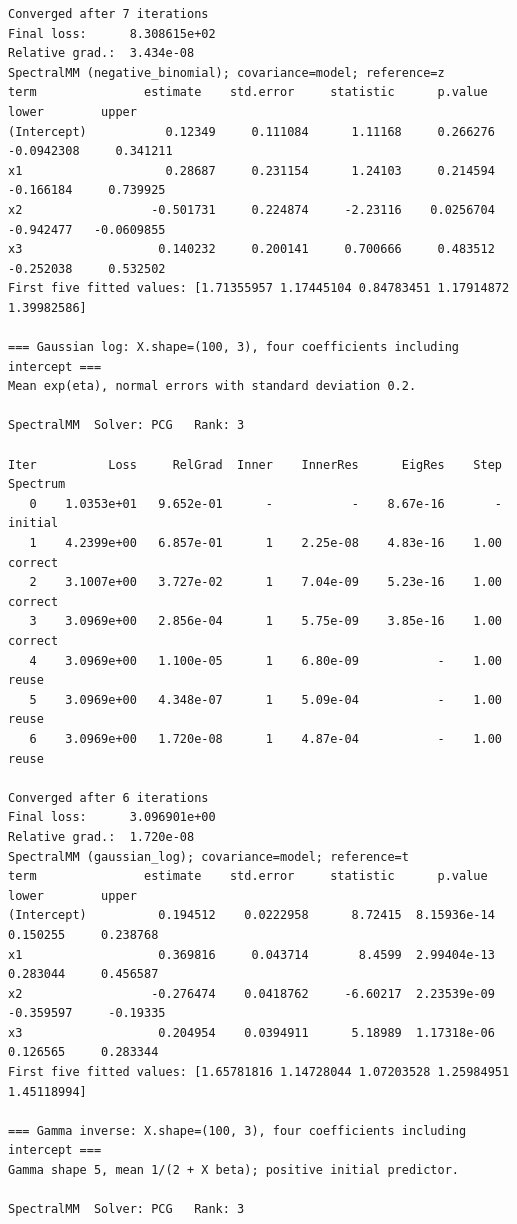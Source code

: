 \documentclass[11pt]{article}
\begin{document}
\begin{lstlisting}
Converged after 7 iterations
Final loss:      8.308615e+02
Relative grad.:  3.434e-08
SpectralMM (negative_binomial); covariance=model; reference=z
term               estimate    std.error     statistic      p.value        lower        upper
(Intercept)           0.12349     0.111084      1.11168     0.266276   -0.0942308     0.341211
x1                    0.28687     0.231154      1.24103     0.214594    -0.166184     0.739925
x2                  -0.501731     0.224874     -2.23116    0.0256704    -0.942477   -0.0609855
x3                   0.140232     0.200141     0.700666     0.483512    -0.252038     0.532502
First five fitted values: [1.71355957 1.17445104 0.84783451 1.17914872 1.39982586]

=== Gaussian log: X.shape=(100, 3), four coefficients including intercept ===
Mean exp(eta), normal errors with standard deviation 0.2.

SpectralMM  Solver: PCG   Rank: 3

Iter          Loss     RelGrad  Inner    InnerRes      EigRes    Step  Spectrum
   0    1.0353e+01   9.652e-01      -           -    8.67e-16       -  initial
   1    4.2399e+00   6.857e-01      1    2.25e-08    4.83e-16    1.00  correct
   2    3.1007e+00   3.727e-02      1    7.04e-09    5.23e-16    1.00  correct
   3    3.0969e+00   2.856e-04      1    5.75e-09    3.85e-16    1.00  correct
   4    3.0969e+00   1.100e-05      1    6.80e-09           -    1.00  reuse
   5    3.0969e+00   4.348e-07      1    5.09e-04           -    1.00  reuse
   6    3.0969e+00   1.720e-08      1    4.87e-04           -    1.00  reuse

Converged after 6 iterations
Final loss:      3.096901e+00
Relative grad.:  1.720e-08
SpectralMM (gaussian_log); covariance=model; reference=t
term               estimate    std.error     statistic      p.value        lower        upper
(Intercept)          0.194512    0.0222958      8.72415  8.15936e-14     0.150255     0.238768
x1                   0.369816     0.043714       8.4599  2.99404e-13     0.283044     0.456587
x2                  -0.276474    0.0418762     -6.60217  2.23539e-09    -0.359597     -0.19335
x3                   0.204954    0.0394911      5.18989  1.17318e-06     0.126565     0.283344
First five fitted values: [1.65781816 1.14728044 1.07203528 1.25984951 1.45118994]

=== Gamma inverse: X.shape=(100, 3), four coefficients including intercept ===
Gamma shape 5, mean 1/(2 + X beta); positive initial predictor.

SpectralMM  Solver: PCG   Rank: 3


\end{lstlisting}
\end{document}
